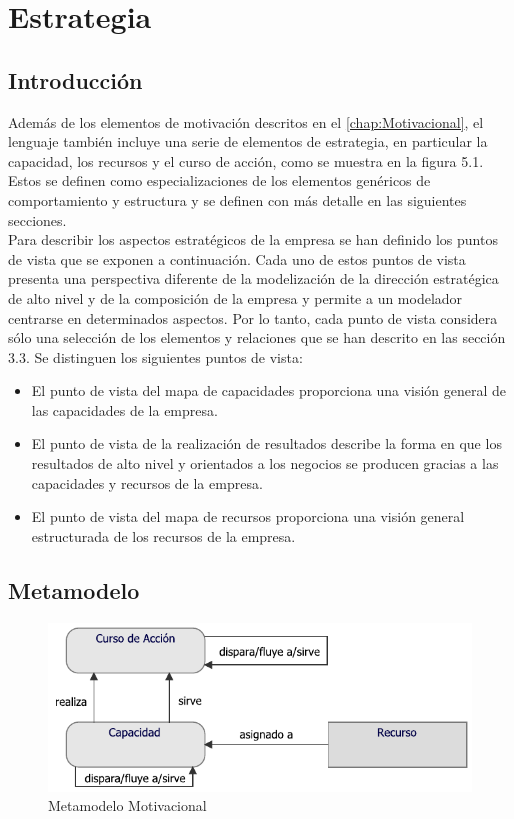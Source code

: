 \chapter{Estrategia}
\section{Introducción}
Además de los elementos de motivación descritos en el \autoref{chap:Motivacional}, el lenguaje también incluye una serie de elementos de estrategia, en particular la capacidad, los recursos y el curso de acción, como se muestra en la figura 5.1. Estos se definen como especializaciones de los elementos genéricos de comportamiento y estructura y se definen con más detalle en las siguientes secciones. \\

Para describir los aspectos estratégicos de la empresa se han definido los puntos de vista que se exponen a continuación. Cada uno de estos puntos de vista presenta una perspectiva diferente de la modelización de la dirección estratégica de alto nivel y de la composición de la empresa y permite a un modelador centrarse en determinados aspectos. Por lo tanto, cada punto de vista considera sólo una selección de los elementos y relaciones que se han descrito en las sección 3.3. Se distinguen los siguientes puntos de vista:

\begin{itemize}
	\item El punto de vista del mapa de capacidades proporciona una visión general de las capacidades de la empresa.
	\item El punto de vista de la realización de resultados describe la forma en que los resultados de alto nivel y orientados a los negocios se producen gracias a las capacidades y recursos de la empresa.
	\item El punto de vista del mapa de recursos proporciona una visión general estructurada de los recursos de la empresa.
\end{itemize}

\newpage

\section{Metamodelo}
\begin{figure}[h!]
	\centering
	\includegraphics[width=0.9\linewidth]{imgs/meta/Estrategia}
	\caption{Metamodelo Motivacional}
\end{figure}

